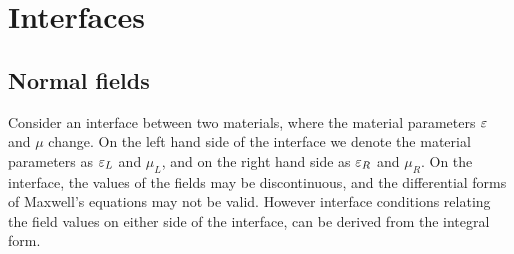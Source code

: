 \section{Interfaces}
% 
%


\subsection{Normal fields}

Consider an interface between two materials, where the material parameters
$\varepsilon$ and $\mu$ change. On the left hand side of the interface we denote the
material parameters as $\varepsilon_L$ and $\mu_L$, and on the right hand side as
$\varepsilon_R$ and $\mu_R$. On the interface, the values of the fields may be
discontinuous, and the differential forms of Maxwell's equations may not be
valid. However interface conditions relating the field values on either side of
the interface, can be derived from the integral form.

